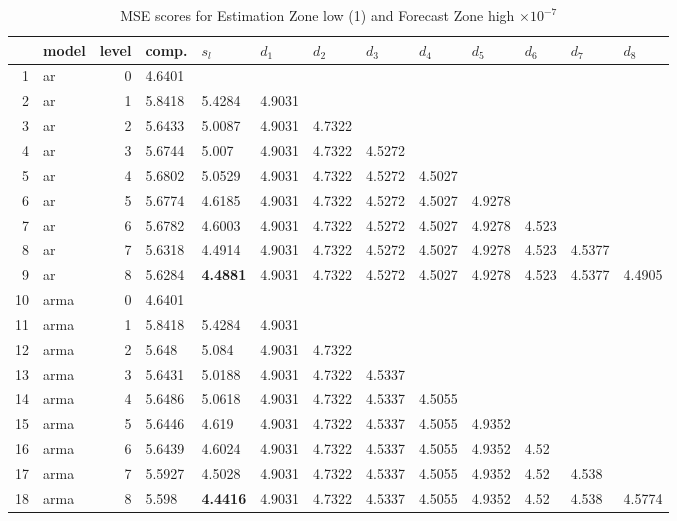 \documentclass[10pt,a4paper]{article}
\begin{document}
\begin{table}[ht]
\centering
\caption{MSE scores for Estimation Zone low (1) and Forecast Zone high $ \times 10^{-7}$} 
\begin{tabular}{rlrllllllllll}
  \hline
 & model & level & comp. & $s_l$ & $d_1$ & $d_2$ & $d_3$ & $d_4$ & $d_5$ & $d_6$ & $d_7$ & $d_8$ \\ 
  \hline
1 & ar &     0 & 4.6401 &  &  &  &  &  &  &  &  &  \\ 
  2 & ar &     1 & 5.8418 & 5.4284 & 4.9031 &  &  &  &  &  &  &  \\ 
  3 & ar &     2 & 5.6433 & 5.0087 & 4.9031 & 4.7322 &  &  &  &  &  &  \\ 
  4 & ar &     3 & 5.6744 & 5.007 & 4.9031 & 4.7322 & 4.5272 &  &  &  &  &  \\ 
  5 & ar &     4 & 5.6802 & 5.0529 & 4.9031 & 4.7322 & 4.5272 & 4.5027 &  &  &  &  \\ 
  6 & ar &     5 & 5.6774 & 4.6185 & 4.9031 & 4.7322 & 4.5272 & 4.5027 & 4.9278 &  &  &  \\ 
  7 & ar &     6 & 5.6782 & 4.6003 & 4.9031 & 4.7322 & 4.5272 & 4.5027 & 4.9278 & 4.523 &  &  \\ 
  8 & ar &     7 & 5.6318 & 4.4914 & 4.9031 & 4.7322 & 4.5272 & 4.5027 & 4.9278 & 4.523 & 4.5377 &  \\ 
  9 & ar &     8 & 5.6284 & \textbf{4.4881} & 4.9031 & 4.7322 & 4.5272 & 4.5027 & 4.9278 & 4.523 & 4.5377 & 4.4905 \\ 
   \hline
10 & arma &     0 & 4.6401 &  &  &  &  &  &  &  &  &  \\ 
  11 & arma &     1 & 5.8418 & 5.4284 & 4.9031 &  &  &  &  &  &  &  \\ 
  12 & arma &     2 & 5.648 & 5.084 & 4.9031 & 4.7322 &  &  &  &  &  &  \\ 
  13 & arma &     3 & 5.6431 & 5.0188 & 4.9031 & 4.7322 & 4.5337 &  &  &  &  &  \\ 
  14 & arma &     4 & 5.6486 & 5.0618 & 4.9031 & 4.7322 & 4.5337 & 4.5055 &  &  &  &  \\ 
  15 & arma &     5 & 5.6446 & 4.619 & 4.9031 & 4.7322 & 4.5337 & 4.5055 & 4.9352 &  &  &  \\ 
  16 & arma &     6 & 5.6439 & 4.6024 & 4.9031 & 4.7322 & 4.5337 & 4.5055 & 4.9352 & 4.52 &  &  \\ 
  17 & arma &     7 & 5.5927 & 4.5028 & 4.9031 & 4.7322 & 4.5337 & 4.5055 & 4.9352 & 4.52 & 4.538 &  \\ 
  18 & arma &     8 & 5.598 & \textbf{4.4416} & 4.9031 & 4.7322 & 4.5337 & 4.5055 & 4.9352 & 4.52 & 4.538 & 4.5774 \\ 

\end{tabular}
\end{table}
\end{document}
